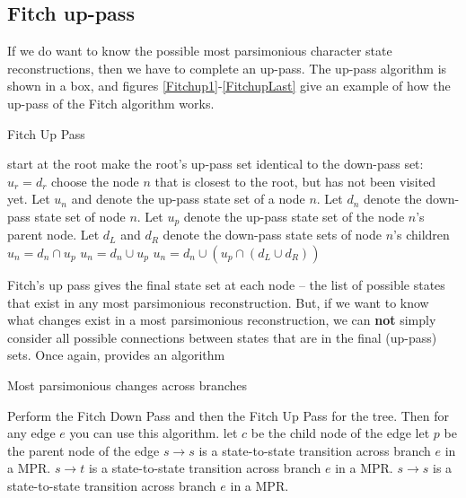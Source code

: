 \documentclass[11pt]{article}
\begin{document}
\subsection*{Fitch up-pass}
If we do want to know the possible most parsimonious character state reconstructions, then we have to complete an
up-pass. The up-pass algorithm is shown in a box, and 
figures \ref{Fitchup1}-\ref{FitchupLast} give an example of how the up-pass of the Fitch algorithm works.

\begin{algorithm} 
\caption{Fitch Up Pass}
\begin{algorithmic}[1]
	 \STATE start at the root
	 \STATE \label{initUp} make the root's up-pass set identical to the down-pass set: $u_r = d_r$
	 	 \STATE choose the node $n$ that is closest to the root, but has not been visited yet.
		 \STATE Let $u_n$ and denote the up-pass state set of a node $n$. 
		 \STATE Let $d_n$ denote the down-pass state set of  node $n$.
		 \STATE Let $u_p$ denote the up-pass state set of the node $n$'s parent node. 
		 \STATE Let $d_L$ and $d_R$ denote the  down-pass state sets of node $n$'s children
		 	\label{restrictUp} \STATE $u_n = d_n \cap u_p$
		 		\label{unionUp}  \STATE  $u_n = d_n\cup u_p$
			\ELSE
				\label{addSharedUp} \STATE $u_n = d_n \cup (u_p \cap (d_L \cup d_R))$
		 \ENDIF
	\ENDWHILE
\end{algorithmic}
\end{algorithm} 

Fitch's up pass gives the final state set at each node -- the list of possible states that exist in any most parsimonious reconstruction.
But,  if we want to know what changes exist in a most parsimonious reconstruction, we can {\bf not} simply consider all possible connections between states that are in the final (up-pass) sets.
Once again, \citet{Fitch1971} provides an algorithm

\begin{algorithm} 
\caption{Most parsimonious changes across branches}
\begin{algorithmic}[1]
	\REQUIRE Perform the Fitch Down Pass and then the Fitch Up Pass for the tree.  Then for any edge $e$ you can use this algorithm.
	\STATE let $c$ be the child node of the edge
	\STATE let $p$ be the parent node of the edge
			\STATE $s\rightarrow s$ is a state-to-state transition across branch $e$ in a MPR.
		\ELSE
			\STATE $s\rightarrow t$ is a state-to-state transition across branch $e$ in a MPR.
		\ENDFOR
			\STATE $s\rightarrow s$ is a state-to-state transition across branch $e$ in a MPR.
		\ENDIF
		\ENDIF
	\ENDFOR
\end{algorithmic}
\end{algorithm}
\end{document}
